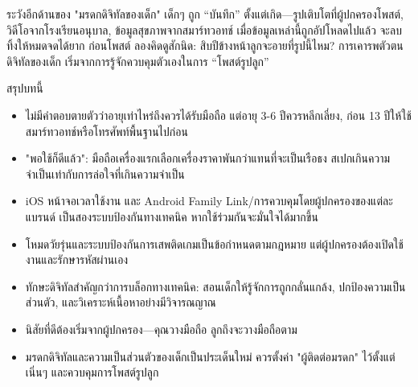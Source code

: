 \begin{tcbwarn}{ระวังอีกด้านของ "มรดกดิจิทัลของเด็ก"}
เด็กๆ ถูก “บันทึก” ตั้งแต่เกิด—รูปเติบโตที่ผู้ปกครองโพสต์, วิดีโอจากโรงเรียนอนุบาล, ข้อมูลสุขภาพจากสมาร์ทวอทช์ เมื่อข้อมูลเหล่านี้ถูกอัปโหลดไปแล้ว จะลบทิ้งให้หมดจดได้ยาก ก่อนโพสต์ ลองคิดดูสักนิด: สิบปีข้างหน้าลูกจะอายที่รูปนี้ไหม? การเคารพตัวตนดิจิทัลของเด็ก เริ่มจากการรู้จักควบคุมตัวเองในการ “โพสต์รูปลูก”

\end{tcbwarn}

\begin{tcbsummary}{สรุปบทนี้}
\begin{itemize}
  \item ไม่มีคำตอบตายตัวว่าอายุเท่าไหร่ถึงควรได้รับมือถือ แต่อายุ 3-6 ปีควรหลีกเลี่ยง, ก่อน 13 ปีให้ใช้สมาร์ทวอทช์หรือโทรศัพท์พื้นฐานไปก่อน
  \item "พอใช้ก็ดีแล้ว": มือถือเครื่องแรกเลือกเครื่องราคาพันกว่าแทนที่จะเป็นเรือธง สเปกเกินความจำเป็นเท่ากับการล่อใจที่เกินความจำเป็น
  \item iOS หน้าจอเวลาใช้งาน และ Android Family Link/การควบคุมโดยผู้ปกครองของแต่ละแบรนด์ เป็นสองระบบป้องกันทางเทคนิค หากใช้ร่วมกันจะมั่นใจได้มากขึ้น
  \item โหมดวัยรุ่นและระบบป้องกันการเสพติดเกมเป็นข้อกำหนดตามกฎหมาย แต่ผู้ปกครองต้องเปิดใช้งานและรักษารหัสผ่านเอง
  \item ทักษะดิจิทัลสำคัญกว่าการบล็อกทางเทคนิค: สอนเด็กให้รู้จักการถูกกลั่นแกล้ง, ปกป้องความเป็นส่วนตัว, และวิเคราะห์เนื้อหาอย่างมีวิจารณญาณ
  \item นิสัยที่ดีต้องเริ่มจากผู้ปกครอง—คุณวางมือถือ ลูกถึงจะวางมือถือตาม
  \item มรดกดิจิทัลและความเป็นส่วนตัวของเด็กเป็นประเด็นใหม่ ควรตั้งค่า "ผู้ติดต่อมรดก" ไว้ตั้งแต่เนิ่นๆ และควบคุมการโพสต์รูปลูก
\end{itemize}

\end{tcbsummary}
